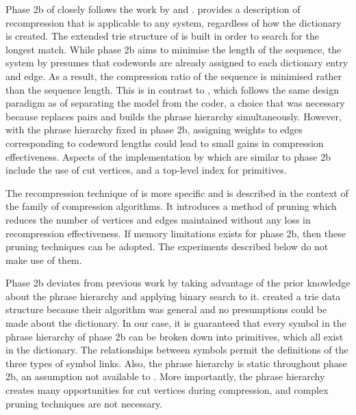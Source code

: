 
Phase 2b of \remerge closely follows the
work by \citet{kr89:cj} and \citet{klein97:cj}.  
\citeauthor{kr89:cj} provides a description of
recompression that is applicable to any system, regardless 
of how the dictionary is created.  The extended trie structure
of \citet{ac75:cacm} is built in order to search for the longest
match.  While phase 2b aims to minimise the length of the
sequence, the system by \citeauthor{kr89:cj} presumes that codewords 
are already assigned to each dictionary entry and edge.  
As a result, the compression ratio of the sequence is 
minimised rather than the sequence length.  This is in contrast
to \remerge, which follows the same design paradigm as \repair
of separating the model from the coder, a choice that was necessary
because \repair replaces
pairs and builds the phrase hierarchy simultaneously.
However, with the phrase hierarchy fixed
in phase 2b, assigning weights to edges corresponding to codeword
lengths could lead to small gains in compression
effectiveness.  Aspects of the implementation by
\citeauthor{kr89:cj} which are similar to phase 2b include the
use of cut vertices, and a top-level index for primitives.

The recompression technique of \citet{klein97:cj} is
more specific and is described in the context of the
\lza family of compression algorithms.  It introduces a
method of pruning which reduces the number of vertices and
edges maintained
without any loss in recompression effectiveness.  If memory
limitations exists for phase 2b, then these pruning techniques
can be adopted.  The experiments
described below do not make use of them.

Phase 2b deviates from previous work by taking advantage of the
prior knowledge about the phrase hierarchy and applying
binary search to it.  \citeauthor{kr89:cj} created a trie
data structure because their algorithm was general and no 
presumptions could be made about the dictionary.  In our case,
it is guaranteed that every symbol in the phrase hierarchy of phase 2b
can be broken down into primitives, which all exist in the 
dictionary.  The relationships between symbols permit
the definitions of the three 
types of symbol links.  Also, the phrase hierarchy is static
throughout phase 2b, an assumption not available to
\citeauthor{klein97:cj}.  More importantly, the \repair 
phrase hierarchy creates many opportunities
for cut vertices during compression, and complex 
pruning techniques are not necessary.

